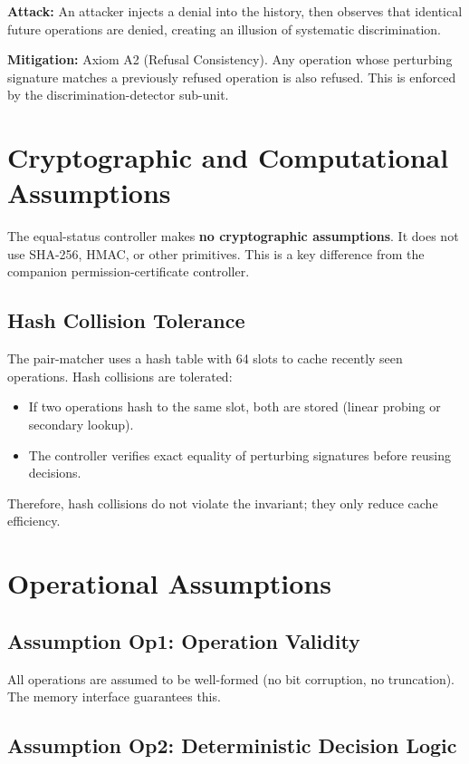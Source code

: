 \documentclass[11pt,oneside]{article}
\begin{document}
\textbf{Attack:} An attacker injects a denial into the history, then observes that identical future operations are denied, creating an illusion of systematic discrimination.

\textbf{Mitigation:} Axiom A2 (Refusal Consistency). Any operation whose perturbing signature matches a previously refused operation is also refused. This is enforced by the discrimination-detector sub-unit.

\section{Cryptographic and Computational Assumptions}

The equal-status controller makes \textbf{no cryptographic assumptions}. It does not use SHA-256, HMAC, or other primitives. This is a key difference from the companion permission-certificate controller.

\subsection{Hash Collision Tolerance}

The pair-matcher uses a hash table with 64 slots to cache recently seen operations. Hash collisions are tolerated:
\begin{itemize}
\item If two operations hash to the same slot, both are stored (linear probing or secondary lookup).
\item The controller verifies exact equality of perturbing signatures before reusing decisions.
\end{itemize}

Therefore, hash collisions do not violate the invariant; they only reduce cache efficiency.

\section{Operational Assumptions}

\subsection{Assumption Op1: Operation Validity}

All operations are assumed to be well-formed (no bit corruption, no truncation). The memory interface guarantees this.

\subsection{Assumption Op2: Deterministic Decision Logic}
\end{document}
